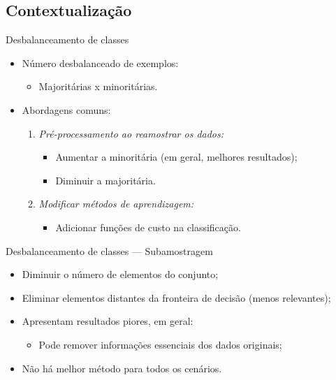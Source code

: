 \documentclass[10pt]{beamer}
\begin{document}
\subsection{Contextualização}
\begin{frame}{Desbalanceamento de classes}
  \setlength\leftmargini{1em}
  \begin{itemize}
    \item Número desbalanceado de exemplos:
      \begin{itemize}
        \item Majoritárias x minoritárias.
      \end{itemize}
    \item Abordagens comuns:
    \begin{enumerate}
      \item \emph{Pré-processamento ao reamostrar os dados:}
      \begin{itemize}
        \item Aumentar a minoritária (em geral, melhores resultados);
        \item Diminuir a majoritária.
      \end{itemize}
      \item \emph{Modificar métodos de aprendizagem:}
      \begin{itemize}
        \item Adicionar funções de custo na classificação.
      \end{itemize}
    \end{enumerate}
  \end{itemize}
\end{frame}
\begin{frame}{Desbalanceamento de classes --- Subamostragem}
  \setlength\leftmargini{1em}
    \begin{itemize}
    \item Diminuir o número de elementos do conjunto;
    \item Eliminar elementos distantes da fronteira de decisão (menos relevantes);
    \item Apresentam resultados piores, em geral:
    \begin{itemize}
      \item Pode remover informações essenciais dos dados originais;
    \end{itemize}
    \item Não há melhor método para todos os cenários.
  \end{itemize}
\end{frame}
\end{document}
